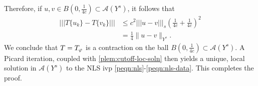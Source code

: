 %
%
Therefore, if $u, v \in B(0, \frac{1}{4c}) \subset \mathcal{A}(Y^s)$, it follows that
%
\begin{equation}
  \label{p21a}
  \begin{split}
    |  | |T\{u_k\} - T\{v_k\} |  | |
    & \le c^2 | | |u -v |  | |_{s} \left( \frac{1}{4c} + 
    \frac{1}{4c} \right)^2
    \\
    & = \frac{1}{4} \|u -v \|_{Y^s}. 
  \end{split}
\end{equation}
%
We conclude that $T = T_{\varphi}$ is a contraction on the ball $B(0, 
\frac{1}{4c}) \subset \mathcal{A}(Y^s)$. A Picard iteration, coupled with
\cref{plem:cutoff-loc-soln} then yields a unique, local
solution in $\mathcal{A}(Y^s)$ to the NLS ivp
\eqref{peqn:nls}-\eqref{peqn:nls-data}. This completes the proof. \qquad
\qedsymbol
%
%
%
%
